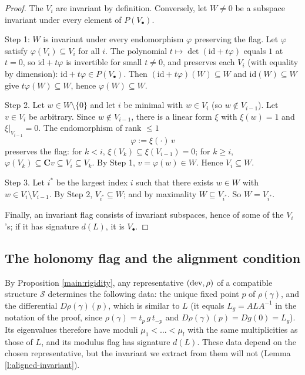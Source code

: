 \documentclass[english,11pt]{amsart}
\theoremstyle{definition}
\theoremstyle{remark}
\numberwithin{equation}{section}
\newcommand{\C}{\mathbf{C}}
\newcommand{\dev}{\mathop{\rm dev}\nolimits}
\newcommand{\Sc}{\mathcal{S}}
\begin{document}
\begin{proof}
The $V_i$ are invariant by definition. Conversely, let $W\neq 0$ be a subspace invariant under every element of $P(V_\bullet)$.

Step 1: $W$ is invariant under every endomorphism $\varphi$ preserving the flag. Let $\varphi$ satisfy $\varphi(V_i)\subseteq V_i$ for all $i$. The polynomial $t\mapsto\det(\mathrm{id}+t\varphi)$ equals $1$ at $t=0$, so $\mathrm{id}+t\varphi$ is invertible for small $t\neq0$, and preserves each $V_i$ (with equality by dimension): $\mathrm{id}+t\varphi\in P(V_\bullet)$. Then $(\mathrm{id}+t\varphi)(W)\subseteq W$ and $\mathrm{id}(W)\subseteq W$ give $t\varphi(W)\subseteq W$, hence $\varphi(W)\subseteq W$.

Step 2. Let $w\in W\setminus\{0\}$ and let $i$ be minimal with $w\in V_i$ (so $w\notin V_{i-1}$). Let $v\in V_i$ be arbitrary. Since $w\notin V_{i-1}$, there is a linear form $\xi$ with $\xi(w)=1$ and $\xi|_{V_{i-1}}=0$. The endomorphism of rank $\le1$
\[
\varphi:=\xi(\cdot)\,v
\]
preserves the flag: for $k<i$, $\xi(V_k)\subseteq\xi(V_{i-1})=0$; for $k\ge i$, $\varphi(V_k)\subseteq\C v\subseteq V_i\subseteq V_k$. By Step 1, $v=\varphi(w)\in W$. Hence $V_i\subseteq W$.

Step 3. Let $i^{*}$ be the largest index $i$ such that there exists $w\in W$ with $w\in V_i\setminus V_{i-1}$. By Step 2, $V_{i^{*}}\subseteq W$; and by maximality $W\subseteq V_{i^{*}}$. So $W=V_{i^{*}}$.

Finally, an invariant flag consists of invariant subspaces, hence of some of the $V_i$'s; if it has signature $d(L)$, it is $V_\bullet$.
\end{proof}

\subsection{The holonomy flag and the alignment condition}

By Proposition \ref{main:rigidity}, any representative $(\dev,\rho)$ of a compatible structure $\Sc$ determines the following data: the unique fixed point $p$ of $\rho(\gamma)$, and the differential $D\rho(\gamma)(p)$, which is similar to $L$ (it equals $L_g=ALA^{-1}$ in the notation of the proof, since $\rho(\gamma)=t_p\,g\,t_{-p}$ and $D\rho(\gamma)(p)=Dg(0)=L_g$). Its eigenvalues therefore have moduli $\mu_1<\dots<\mu_l$ with the same multiplicities as those of $L$, and its modulus flag has signature $d(L)$. These data depend on the chosen representative, but the invariant we extract from them will not (Lemma \ref{l:aligned-invariant}).
\end{document}
